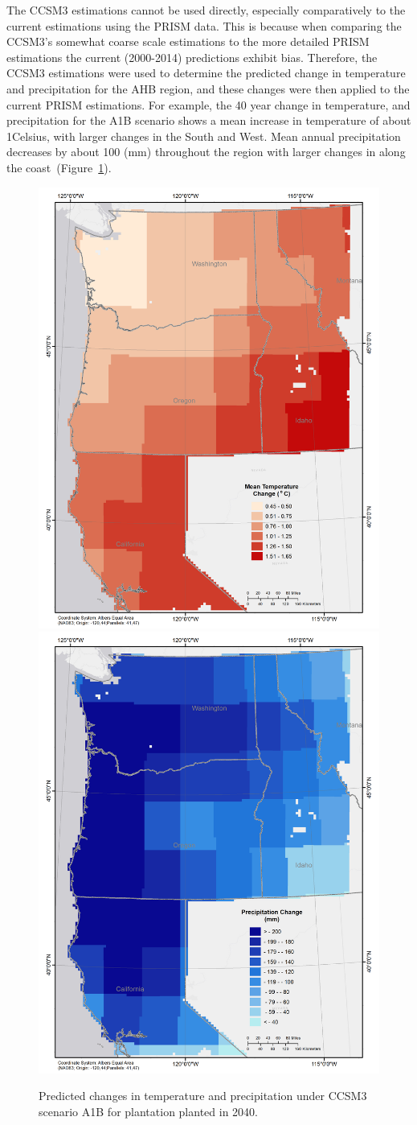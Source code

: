 \documentclass[preprint,review,12pt]{elsarticle}
\begin{document}
The \ac{CCSM3} estimations cannot be used directly, especially
comparatively to the current estimations using the \ac{PRISM} data.
This is because when comparing the \ac{CCSM3}'s somewhat coarse scale
estimations to the more detailed \ac{PRISM} estimations the current
(2000-2014) predictions exhibit bias.  Therefore, the \ac{CCSM3}
estimations were used to determine the predicted change in temperature
and precipitation for the \ac {AHB} region, and these changes were
then applied to the current \ac{PRISM} estimations. For example, the
40 year change in temperature, and precipitation for the A1B scenario
shows a mean increase in temperature of about 1\degree Celsius, with
larger changes in the South and West.  Mean annual precipitation
decreases by about 100 (mm) throughout the region with larger changes
in along the coast~(Figure~\ref{fig:change}).

\begin{figure}[hp]
  \centering
  \includegraphics[width=0.45\linewidth]{temp_change}
  \includegraphics[width=0.45\linewidth]{precip_change.png}
  \caption{Predicted changes in temperature and precipitation under \ac{CCSM3} scenario A1B for plantation planted in 2040.}
  \label{fig:change}
\end{figure}
\end{document}

